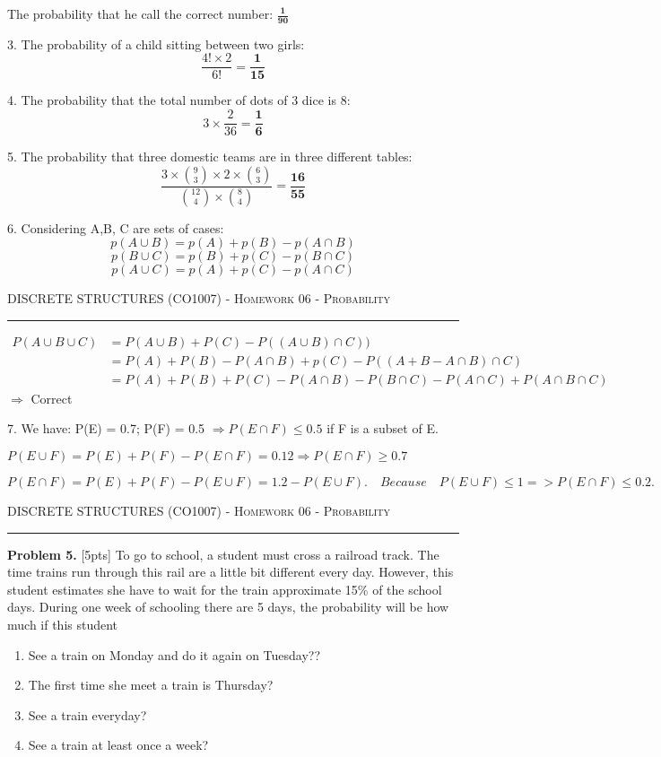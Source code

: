 \documentclass[12pt]{amsart}
\begin{document}
The probability that he call the correct number:  $\displaystyle \mathbf{\frac{1}{90}}$

3. The probability of a child sitting between two girls:
\[\frac{4!\times 2}{6!}=\mathbf{\frac{1}{15}}\]

4. The probability that the total number of dots of 3 dice is 8:
\[3\times\frac{2}{36}=\mathbf{\frac{1}{6}}\]

5. The probability that three domestic teams are in three different tables: \[\frac{3\times\binom{9}{3}\times 2\times\binom{6}{3}}{\binom{12}{4} \times \binom{8}{4}}= \mathbf{\frac{16}{55}}\]

6. Considering A,B, C are sets of cases:
\[p(A\cup B) = p(A) + p(B) - p(A\cap B)\]
\[p(B\cup C) = p(B) + p(C) - p(B\cap C)\]
\[p(A\cup C) = p(A) + p(C) - p(A\cap C)\]
\newpage

{\scshape } \hfill {\scshape DISCRETE STRUCTURES (CO1007) - Homework 06 - Probability} \hfill {\scshape }
 
\smallskip

\hrule

\bigskip

\bigskip 

\begin{align*}
    P(A\cup B\cup C)&= P(A\cup B)+ P(C) - P((A\cup B)\cap C))\\
                    &= P(A) + P(B) -P(A\cap B) + p(C) - P((A+B-A\cap B)\cap C)\\
                    &= P(A) + P(B) + P(C) - P(A\cap B) - P(B\cap C) - P(A\cap C)+P(A\cap B \cap C)
\end{align*}
$\displaystyle \Rightarrow$ Correct

7. We have:
P(E) = 0.7; P(F) = 0.5 $\displaystyle \Rightarrow P(E\cap F) \leq 0.5$ if F is a subset of E.
\bigskip

$P(E\cup F) = P(E) + P(F) - P(E\cap F) = 0.12 \Rightarrow P(E\cap F) \geq 0.7$
\bigskip

$P(E\cap F) = P(E) + P(F)- P(E\cup F) = 1.2 - P(E\cup F).\quad Because\quad P(E\cup F) \leq 1 => P(E\cap F) \leq 0.2.$
\newpage

{\scshape } \hfill {\scshape DISCRETE STRUCTURES (CO1007) - Homework 06 - Probability} \hfill {\scshape }
 
\smallskip

\hrule

\bigskip

\bigskip 
\textbf{Problem 5. }[5pts] To go to school, a student must cross a railroad track. The time trains run through
this rail are a little bit different every day. However, this student estimates she have to wait for the train
approximate 15\% of the school days. During one week of schooling there are 5 days, the probability will be
how much if this student
\begin{enumerate}
    \item See a train on Monday and do it again on Tuesday??
    \item The first time she meet a train is Thursday?
    \item See a train everyday?
    \item See a train at least once a week?
\end{enumerate}
\bigskip
\end{document}
